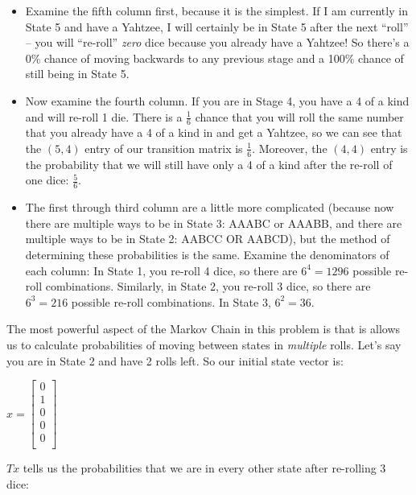 \documentclass[12pt,a4paper]{article}
\begin{document}
\begin{itemize}
    \item Examine the fifth column first, because it is the simplest. If I am currently in State 5 and have a Yahtzee, I will certainly be in State 5 after the next “roll” -- you will “re-roll” \textit{zero} dice because you already have a Yahtzee! So there’s a 0\% chance of moving backwards to any previous stage and a 100\% chance of still being in State 5.
    \item Now examine the fourth column. If you are in Stage 4, you have a 4 of a kind and will re-roll 1 die. There is a $\frac{1}{6}$ chance that you will roll the same number that you already have a 4 of a kind in and get a Yahtzee, so we can see that the $(5, 4)$ entry of our transition matrix is $\frac{1}{6}$. Moreover, the $(4, 4)$ entry is the probability that we will still have only a 4 of a kind after the re-roll of one dice: $\frac{5}{6}$.
    \item The first through third column are a little more complicated (because now there are multiple ways to be in State 3: AAABC or AAABB, and there are multiple ways to be in State 2: AABCC OR AABCD), but the method of determining these probabilities is the same. Examine the denominators of each column: In State 1, you re-roll 4 dice, so there are $6^4 = 1296$ possible re-roll combinations. Similarly, in State 2, you re-roll 3 dice, so there are $6^3 = 216$ possible re-roll combinations. In State 3, $6^2 = 36$.
\end{itemize}

The most powerful aspect of the Markov Chain in this problem is that is allows us to calculate probabilities of moving between states in \textit{multiple} rolls. Let’s say you are in State 2 and have 2 rolls left. So our initial state vector is:

\vspace{5mm}

$x = \begin{bmatrix}
0 \\
1 \\
0 \\
0 \\
0 \\
\end{bmatrix}$

\vspace{5mm}

$Tx$ tells us the probabilities that we are in every other state after re-rolling 3 dice:
\end{document}
